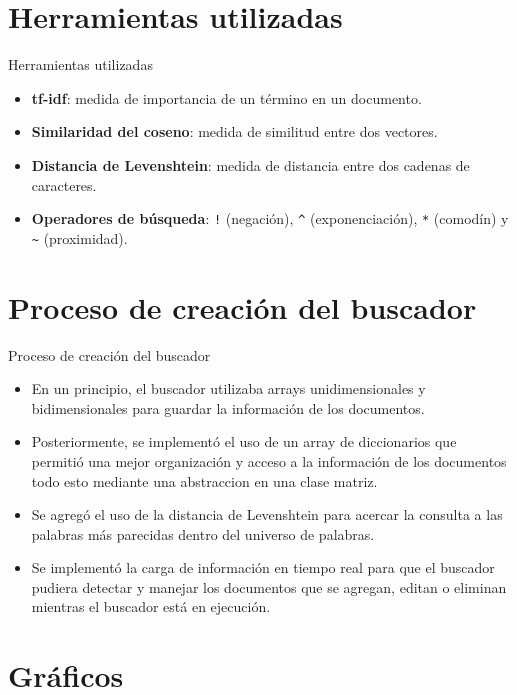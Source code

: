 \documentclass{beamer}
\begin{document}
\section{Herramientas utilizadas}

\begin{frame}{Herramientas utilizadas}
  \begin{itemize}
    \item \textbf{tf-idf}: medida de importancia de un término en un documento.
    \item \textbf{Similaridad del coseno}: medida de similitud entre dos vectores.
    \item \textbf{Distancia de Levenshtein}: medida de distancia entre dos cadenas de caracteres.
    \item \textbf{Operadores de búsqueda}: \texttt{!} (negación), \texttt{\^{}} (exponenciación), \texttt{*} (comodín) y \texttt{\~{}} (proximidad).
  \end{itemize}
\end{frame}

\section{Proceso de creación del buscador}

\begin{frame}{Proceso de creación del buscador}
  \begin{itemize}
    \item En un principio, el buscador utilizaba arrays unidimensionales y bidimensionales para guardar la información de los documentos.
    \item Posteriormente, se implementó el uso de un array de diccionarios que permitió una mejor organización y acceso a la información de los documentos todo esto mediante una abstraccion en una clase matriz.
    \item Se agregó el uso de la distancia de Levenshtein para acercar la consulta a las palabras más parecidas dentro del universo de palabras.
    \item Se implementó la carga de información en tiempo real para que el buscador pudiera detectar y manejar los documentos que se agregan, editan o eliminan mientras el buscador está en ejecución.
  \end{itemize}
\end{frame}

\section{Gráficos}
\end{document}
